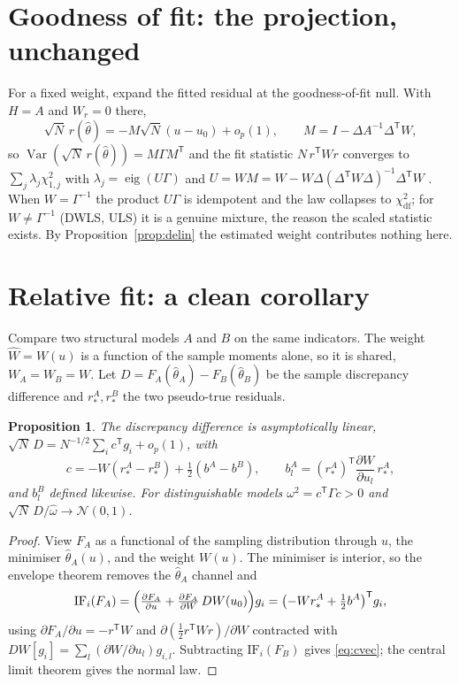 \documentclass[11pt]{article}
\newcommand{\Var}{\operatorname{Var}}
\newcommand{\T}{^{\mathsf{T}}}
\newcommand{\Wr}{W_{\!r}}
\newcommand{\rs}{r_{*}}
\theoremstyle{plain}
\newtheorem{proposition}{Proposition}
\theoremstyle{remark}
\begin{document}
\section{Goodness of fit: the projection, unchanged}
\label{sec:gof}

For a fixed weight, expand the fitted residual at the goodness-of-fit null. With
$H=A$ and $\Wr=0$ there,
\[
  \sqrt{N}\,r(\widehat\theta)=-M\sqrt{N}(u-u_{0})+o_{p}(1),
  \qquad M=I-\Delta A^{-1}\Delta\T W,
\]
so $\Var(\sqrt N\,r(\widehat\theta))=M\Gamma M\T$ and the fit statistic
$N\,r\T W r$ converges to $\sum_{j}\lambda_{j}\chi^{2}_{1,j}$ with $\lambda_{j}=
\operatorname{eig}(U\Gamma)$ and $U=WM=W-W\Delta(\Delta\T W\Delta)^{-1}\Delta\T
W$ \cite{satorra1989}. When $W=\Gamma^{-1}$ the product $U\Gamma$ is idempotent
and the law collapses to $\chi^{2}_{\mathrm{df}}$; for $W\neq\Gamma^{-1}$ (DWLS,
ULS) it is a genuine mixture, the reason the scaled statistic
\cite{satorrabentler2001} exists. By Proposition~\ref{prop:delin} the estimated
weight contributes nothing here.

\section{Relative fit: a clean corollary}
\label{sec:vuong}

Compare two structural models $A$ and $B$ on the same indicators. The weight
$\widehat W=W(u)$ is a function of the sample moments alone, so it is shared,
$W_{A}=W_{B}=W$. Let $D=F_{A}(\widehat\theta_{A})-F_{B}(\widehat\theta_{B})$ be
the sample discrepancy difference and $\rs^{A},\rs^{B}$ the two pseudo-true
residuals.

\begin{proposition}
\label{prop:vuong}
The discrepancy difference is asymptotically linear, $\sqrt{N}\,D=N^{-1/2}\sum_{i}
c\T g_{i}+o_{p}(1)$, with
\begin{equation}
  c = -W(\rs^{A}-\rs^{B}) + \tfrac12(b^{A}-b^{B}),
  \qquad
  b^{A}_{l}=(\rs^{A})\T\frac{\partial W}{\partial u_{l}}\,\rs^{A},
  \label{eq:cvec}
\end{equation}
and $b^{B}_{l}$ defined likewise. For distinguishable models $\omega^{2}=c\T
\Gamma c>0$ and $\sqrt{N}\,D/\widehat\omega\to\mathcal N(0,1)$.
\end{proposition}

\begin{proof}
View $F_{A}$ as a functional of the sampling distribution through $u$, the
minimiser $\widehat\theta_{A}(u)$, and the weight $W(u)$. The minimiser is
interior, so the envelope theorem removes the $\widehat\theta_{A}$ channel and
\[
  \mathrm{IF}_{i}(F_{A})
  = \Bigl(\tfrac{\partial F_{A}}{\partial u}
    + \tfrac{\partial F_{A}}{\partial W}\,DW(u_{0})\Bigr)g_{i}
  = \bigl(-W\rs^{A}+\tfrac12 b^{A}\bigr)\T g_{i},
\]
using $\partial F_{A}/\partial u=-r\T W$ and $\partial(\tfrac12 r\T W r)/\partial
W$ contracted with $DW[g_{i}]=\sum_{l}(\partial W/\partial u_{l})g_{i,l}$.
Subtracting $\mathrm{IF}_{i}(F_{B})$ gives \eqref{eq:cvec}; the central limit
theorem gives the normal law.
\end{proof}
\end{document}
